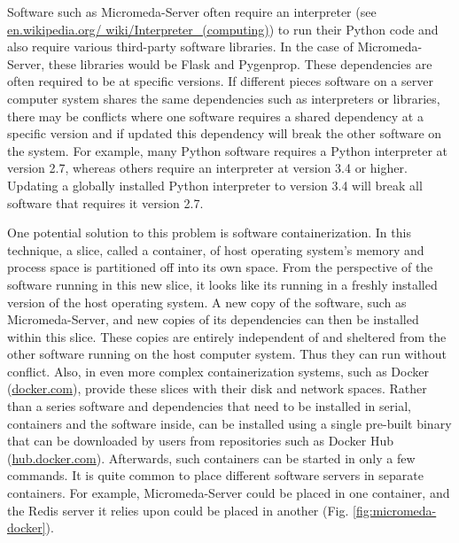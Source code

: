 Software such as Micromeda-Server often require an interpreter \cite{bennett1952interpretative} (see \href{en.wikipedia.org/wiki/Interpreter\_(computing)}{en.wikipedia.org/ wiki/Interpreter\_(computing)}) to run their Python code and also require various third-party software libraries. In the case of Micromeda-Server, these libraries would be Flask and Pygenprop. These dependencies are often required to be at specific versions. If different pieces software on a server computer system shares the same dependencies such as interpreters or libraries, there may be conflicts where one software requires a shared dependency at a specific version and if updated this dependency will break the other software on the system. For example, many Python software requires a Python interpreter at version 2.7, whereas others require an interpreter at version 3.4 or higher. Updating a globally installed Python interpreter to version 3.4 will break all software that requires it version 2.7. 

One potential solution to this problem is software containerization. In this technique, a slice, called a container, of host operating system's memory and process space is partitioned off into its own space. From the perspective of the software running in this new slice, it looks like its running in a freshly installed version of the host operating system. A new copy of the software, such as Micromeda-Server, and new copies of its dependencies can then be installed within this slice. These copies are entirely independent of and sheltered from the other software running on the host computer system. Thus they can run without conflict. Also, in even more complex containerization systems, such as Docker (\href{docker.com}{docker.com}), provide these slices with their disk and network spaces. Rather than a series software and dependencies that need to be installed in serial, containers and the software inside, can be installed using a single pre-built binary that can be downloaded by users from repositories such as Docker Hub (\href{hub.docker.com}{hub.docker.com}). Afterwards, such containers can be started in only a few commands. It is quite common to place different software servers in separate containers. For example, Micromeda-Server could be placed in one container, and the Redis server it relies upon could be placed in another (Fig. \ref{fig:micromeda-docker}). 


